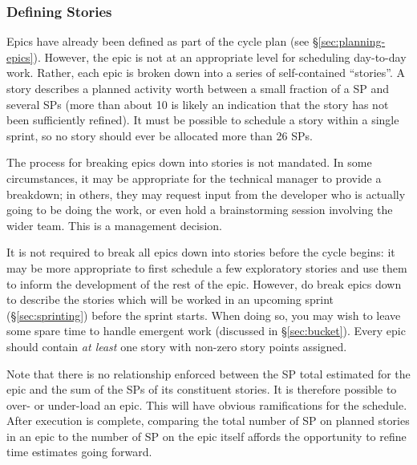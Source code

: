 \subsubsection{Defining Stories}
\label{sec:defining-stories}

Epics have already been defined as part of the \gls{cycle} plan (see \S\ref{sec:planning-epics}).
However, the \gls{epic} is not at an appropriate level for scheduling day-to-day work.
Rather, each \gls{epic} is broken down into a series of self-contained ``stories''.
A \gls{story} describes a planned activity worth between a small fraction of a SP and several \glspl{SP} (more than about 10 is likely an indication that the \gls{story} has not been sufficiently refined).
It must be possible to schedule a \gls{story} within a single sprint, so no \gls{story} should ever be allocated more than 26 \glspl{SP}.

The process for breaking \glspl{epic} down into stories is not mandated. In
some circumstances, it may be appropriate for the technical manager to
provide a breakdown; in others, they may request input from the
developer who is actually going to be doing the work, or even hold a
brainstorming session involving the wider team. This is a management
decision.

It is not required to break all \glspl{epic} down into stories before the \gls{cycle} begins: it may be more appropriate to first schedule a few exploratory stories and use them to inform the development of the rest of the \gls{epic}.
However, do break \glspl{epic} down to describe the stories which will be worked in an upcoming sprint (\S\ref{sec:sprinting}) before the sprint starts.
When doing so, you may wish to leave some spare time to handle emergent work (discussed in \S\ref{sec:bucket}).
Every \gls{epic} should contain \emph{at least} one \gls{story} with non-zero \gls{story} points assigned.

Note that there is no relationship enforced between the \gls{SP} total estimated for the \gls{epic} and the sum of the \glspl{SP} of its constituent stories.
It is therefore possible to over- or under-load an \gls{epic}.
This will have obvious ramifications for the schedule.
After execution is complete, comparing the total number of \gls{SP} on planned stories in an \gls{epic} to the number of \gls{SP} on the \gls{epic} itself affords the opportunity to refine time estimates going forward.


